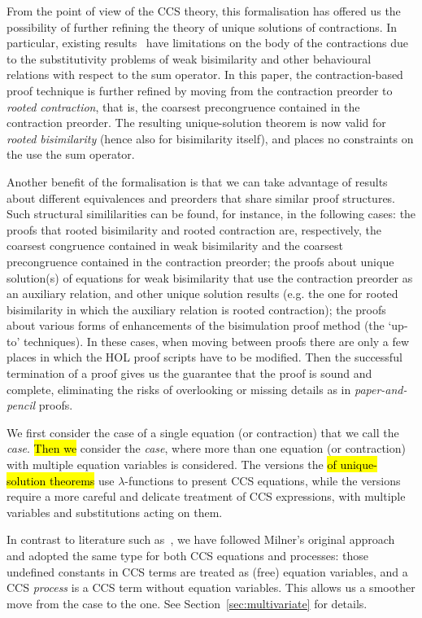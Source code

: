 From the point of view of the CCS theory, this formalisation has offered us the possibility of
further refining the theory of unique solutions of contractions.
In particular,  existing results~\cite{sangiorgi2017equations} have limitations on the body of the contractions due to the
substitutivity problems of weak bisimilarity and other behavioural relations with respect
to the sum operator.
In this paper, the contraction-based proof technique is further
refined by moving from the contraction preorder to
\emph{rooted contraction}, that is, the coarsest precongruence contained in the contraction
preorder. The resulting unique-solution theorem is now valid for
\emph{rooted bisimilarity} (hence also for bisimilarity itself), and places no 
constraints on the use the sum operator.

Another benefit of the formalisation is 
that we can take advantage of results about different 
equivalences and preorders that share similar proof structures.
Such structural simililarities can be found, for instance, in the
following cases: the proofs that rooted bisimilarity and rooted
contraction are, respectively, the coarsest congruence contained in
weak bisimilarity and the coarsest precongruence contained in the
contraction preorder; the proofs about unique solution(s) of equations
for weak bisimilarity that use the contraction preorder as an
auxiliary relation, and other unique solution results (e.g. the one
for rooted bisimilarity 
 in which the auxiliary relation is rooted contraction); the
proofs about various forms of enhancements of the bisimulation proof
method (the `up-to' techniques).
%
In these cases, when moving between proofs there are only a few places in
which the HOL proof scripts have to be modified.
Then the successful termination of a proof gives us the
 guarantee that the proof is
sound and complete, eliminating the risks 
of overlooking or missing details as in \emph{paper-and-pencil} proofs.

We first consider the case of a single equation (or contraction)
that we call the \emph{\univariate case}. \hl{Then we} consider
the \emph{\multivariate case}, where more than one equation
  (or contraction) with multiple equation variables is considered.
The \univariate versions the \hl{of unique-solution theorems} use
$\lambda$-functions to present CCS equations,
while the \multivariate versions require a
more careful and delicate treatment of CCS
expressions, with multiple variables and substitutions acting on them.

In contrast to literature  such as~\cite{Gorrieri:2015jt},
we have followed Milner's original approach~\cite{milner1990operational} and adopted the same
type for both CCS equations and processes: those undefined constants
in CCS terms are treated as  (free) equation variables, and a CCS
\emph{process} is a CCS term without equation variables. 
This allows us a smoother move from the \univariate case to the \multivariate
one. See Section~\ref{sec:multivariate} for  details.

